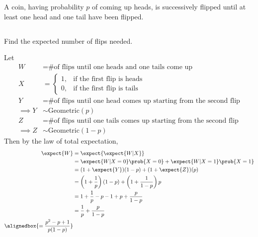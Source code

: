 \documentclass[hwnumber=5,studentnumber=20053722]{mthe353answer}
\begin{document}
  \begin{questions}
    \setcounter{question}{0}
    \question{}
    A coin, having probability \(p\)  of coming up heads, is successively flipped
    until at least one head and one tail have been flipped.
    \begin{parts}
      \part{}
      Find the expected number of flips needed.
      \begin{solution}
        Let
        \begin{align*}
          W &= \text{\# of flips until one heads and one tails come up}\\
          X &= \begin{cases}
            1, & \text{if the first flip is heads}\\
            0, & \text{if the first flip is tails}
          \end{cases}\\
          Y &= \text{\# of flips until one head comes up starting from the second flip}\\
            \implies Y &\sim \text{Geometric}(p)\\
          Z &= \text{\# of flips until one tails comes up starting from the second flip}\\
            \implies Z &\sim \text{Geometric}(1-p)
        \end{align*}
        Then by the law of total expectation,
        \begin{align*}
          \expect{W} &= \expect{\expect{W | X}}\\
          &= \expect{W|X=0}\prob{X=0} + \expect{W|X=1}\prob{X=1}\\
          &= (1 + \expect{Y})(1-p) + (1 + \expect{Z})(p)\\
          &= \left(1 + \frac{1}{p}\right)(1-p) + \left(1+\frac{1}{1-p}\right)p\\
          &= 1 + \frac{1}{p} -p -1 + p + \frac{p}{1-p}\\
          &= \frac{1}{p} + \frac{p}{1-p}\\
          \alignedbox{= \frac{p^2 - p + 1}{p(1-p)}}
        \end{align*}
      \end{solution}

\end{parts}
\end{questions}
\end{document}
